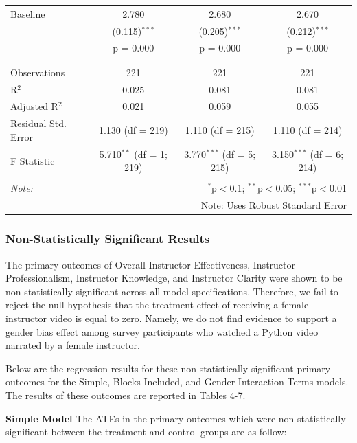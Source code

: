 \documentclass[
]{article}
\begin{document}
\begin{table}[!htbp]
\begin{tabular}{@{\extracolsep{3pt}}lccc}
 Baseline & 2.780 & 2.680 & 2.670 \\ 
  & (0.115)$^{***}$ & (0.205)$^{***}$ & (0.212)$^{***}$ \\ 
  & p = 0.000 & p = 0.000 & p = 0.000 \\ 
  & & & \\ 
\hline \\[-1.8ex] 
Observations & 221 & 221 & 221 \\ 
R$^{2}$ & 0.025 & 0.081 & 0.081 \\ 
Adjusted R$^{2}$ & 0.021 & 0.059 & 0.055 \\ 
Residual Std. Error & 1.130 (df = 219) & 1.110 (df = 215) & 1.110 (df = 214) \\ 
F Statistic & 5.710$^{**}$ (df = 1; 219) & 3.770$^{***}$ (df = 5; 215) & 3.150$^{***}$ (df = 6; 214) \\ 
\hline 
\hline \\[-1.8ex] 
\textit{Note:}  & \multicolumn{3}{r}{$^{*}$p$<$0.1; $^{**}$p$<$0.05; $^{***}$p$<$0.01} \\ 
 & \multicolumn{3}{r}{Note: Uses Robust Standard Error} \\ 
\end{tabular} 
\end{table}

\hypertarget{non-statistically-significant-results}{%
\subsubsection{Non-Statistically Significant
Results}\label{non-statistically-significant-results}}

The primary outcomes of Overall Instructor Effectiveness, Instructor
Professionalism, Instructor Knowledge, and Instructor Clarity were shown
to be non-statistically significant across all model specifications.
Therefore, we fail to reject the null hypothesis that the treatment
effect of receiving a female instructor video is equal to zero. Namely,
we do not find evidence to support a gender bias effect among survey
participants who watched a Python video narrated by a female instructor.

Below are the regression results for these non-statistically significant
primary outcomes for the Simple, Blocks Included, and Gender Interaction
Terms models. The results of these outcomes are reported in Tables 4-7.

\textbf{Simple Model} The ATEs in the primary outcomes which were
non-statistically significant between the treatment and control groups
are as follow:
\end{document}
